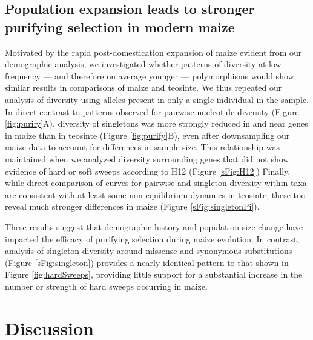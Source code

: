 \documentclass{pnastwo}
\newcommand{\citex}{\textcolor{red}{\bf CITE}}
\newcommand{\X}{\textcolor{red}{\bf X}}
\begin{document}
\begin{article}

\subsection{Population expansion leads to stronger purifying selection in modern maize}
Motivated by the rapid post-domestication expansion of maize evident from our demographic analysis, we investigated whether patterns of diversity at low frequency --- and therefore on average younger --- polymorphisms would show similar results in comparisons of maize and teosinte.
We thus repeated our analysis of diversity using alleles present in only a single individual in the sample.
In direct contrast to patterns observed for pairwise nucleotide diversity (Figure \ref{fig:purify}A), diversity of singletons was more strongly reduced in and near genes in maize than in teosinte (Figure \ref{fig:purify}B), even after downsampling our maize data to account for differences in sample size. This relationship was maintained when we analyzed diversity surrounding genes that did not show evidence of hard or soft sweeps according to H12 (Figure \ref{sFig:H12})
Finally, while direct comparison of curves for pairwise and singleton diversity within taxa are consistent with at least some non-equilibrium dynamics in teosinte, these too reveal much stronger differences in maize (Figure \ref{sFig:singletonPi}). %

These results suggest that demographic history and population size change have impacted the efficacy of purifying selection during maize evolution.
In contrast, analysis of singleton diversity around missense and synonymous substitutions (Figure \ref{sFig:singleton}) provides a nearly identical pattern to that shown in Figure \ref{fig:hardSweeps}, providing little support for a substantial increase in the number or strength of hard sweeps occurring in maize.  

\section{Discussion}



\end{article}
\end{document}
